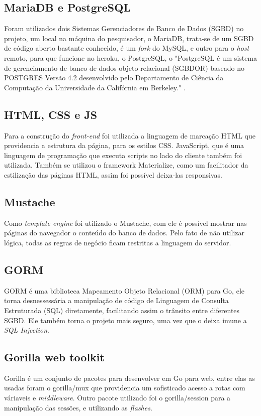 \subsection{\textbf{MariaDB e PostgreSQL}}

Foram utilizados dois Sistemas Gerenciadores de Banco de Dados (SGBD) no projeto, um local na máquina do pesquisador, o MariaDB, trata-se de um SGBD de código aberto bastante conhecido, é um \textit{fork} do MySQL, e outro para o \textit{host} remoto, para que funcione no heroku, o PostgreSQL, o "PostgreSQL é um sistema de gerenciamento de banco de dados objeto-relacional (SGBDOR) baseado no POSTGRES Versão 4.2 desenvolvido pelo Departamento de Ciência da Computação da Universidade da Califórnia em Berkeley."  \cite{postgres07}.

\subsection{\textbf{HTML, CSS e JS}}

Para a construção do \textit{front-end} foi utilizada a linguagem de marcação HTML que providencia a estrutura da página, para os estilos CSS. JavaScript, que é uma linguagem de programação que executa scripts no lado do cliente também foi utilizada. Também se utilizou o framework Materialize, como um facilitador da estilização das páginas HTML, assim foi possível deixa-las responsivas.

\subsection{\textbf{Mustache}}

Como \textit{template engine} foi utilizado o Mustache, com ele é possível mostrar nas páginas do navegador o conteúdo do banco de dados. Pelo fato de não utilizar lógica, todas as regras de negócio ficam restritas a linguagem do servidor.

\subsection{\textbf{GORM}}

GORM é uma biblioteca Mapeamento Objeto Relacional (ORM) para Go, ele torna desnessessária a manipulação de código de Linguagem de Consulta Estruturada (SQL) diretamente, facilitando assim o trânsito entre diferentes SGBD. Ele também torna o projeto mais seguro, uma vez que o deixa imune a \textit{SQL Injection}.

\subsection{\textbf{Gorilla web toolkit}}

Gorilla é um conjunto de pacotes para desenvolver em Go para web, entre elas as usadas foram o gorilla/mux que providencia um sofisticado acesso a rotas com váriaveis e \textit{middleware}. Outro pacote utilizado foi o gorilla/session para a manipulação das sessões, e utilizando as \textit{flashes}.
